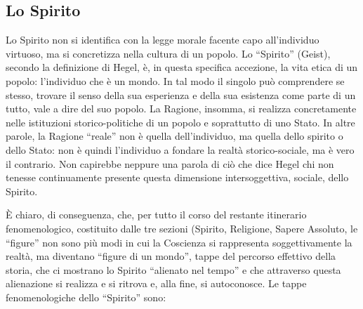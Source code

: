 \documentclass[a4paper,12pt,oneside,openany]{book}%
\begin{document}
\subsection*{Lo Spirito}

Lo Spirito non si identifica con la legge morale facente capo all’individuo virtuoso, ma si concretizza nella cultura di un popolo. Lo “Spirito” (Geist), secondo la definizione di Hegel, è, in questa specifica accezione, la vita etica di un popolo: l’individuo che è un mondo. In tal modo il singolo può comprendere se stesso, trovare il senso della sua esperienza e della sua esistenza come parte di un tutto, vale a dire del suo popolo. La Ragione, insomma, si realizza concretamente nelle istituzioni storico-politiche di un popolo e soprattutto di uno Stato. In altre parole, la Ragione “reale” non è quella dell’individuo, ma quella dello spirito o dello Stato: non è quindi l’individuo a fondare la realtà storico-sociale, ma è vero il contrario.  Non capirebbe neppure una parola di ciò che dice Hegel chi non tenesse continuamente presente questa dimensione intersoggettiva, sociale, dello Spirito.

È chiaro, di conseguenza, che, per tutto il corso del restante itinerario fenomenologico, costituito dalle tre sezioni (Spirito, Religione, Sapere Assoluto, le “figure” non sono più modi in cui la Coscienza si rappresenta soggettivamente la realtà, ma diventano “figure di un mondo”, tappe del percorso effettivo della storia, che ci mostrano lo Spirito “alienato nel tempo” e che attraverso questa alienazione si realizza e si ritrova e, alla fine, si autoconosce. Le tappe fenomenologiche dello “Spirito” sono:
\end{document}
